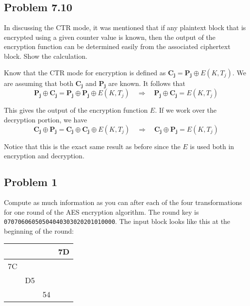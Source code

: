 \documentclass[../hw_sols.tex]{subfiles}
\begin{document}

\subsection*{Problem 7.10}

In discussing the CTR mode, it was mentioned that if any plaintext block that 
is encrypted using a given counter value is known, then the output of the 
encryption function can be determined easily from the associated ciphertext 
block. Show the calculation.

\begin{solution}

Know that the CTR mode for encryption is defined as 
$\mathbf{C_j} = \mathbf{P_j} \oplus E(K,T_j)$. We are assuming that both 
$\mathbf{C_j}$ and $\mathbf{P_j}$ are known. It follows that 
	\[ \mathbf{P_j} \oplus \mathbf{C_j} 
	= \mathbf{P_j} \oplus \mathbf{P_j} \oplus E(K,T_j) 
	\quad \Rightarrow \quad 
	\mathbf{P_j} \oplus \mathbf{C_j} = E(K,T_j) \]

This gives the output of the encryption function $E$. If we work over the 
decryption portion, we have
	\[ \mathbf{C_j} \oplus \mathbf{P_j} 
	= \mathbf{C_j} \oplus \mathbf{C_j} \oplus E(K,T_j) 
	\quad \Rightarrow \quad 
	\mathbf{C_j} \oplus \mathbf{P_j} = E(K,T_j) \]

Notice that this is the exact same result as before since the $E$ is used both 
in encryption and decryption.

\end{solution}


\newpage



\subsection*{Problem 1}

Compute as much information as you can after each of the four transformations 
for one round of the AES encryption algorithm. The round key is 
\verb|07070606050504040303020201010000|. The input block looks like this at 
the beginning of the round:
\begin{center}
\begin{tabular}{| c | c | c | c |}
	\hline
	   &    &    & 7D \\ \hline
	7C &    &    &    \\ \hline
	   & D5 &    &    \\ \hline
	   &    & 54 &    \\ \hline
\end{tabular}
\end{center}
\end{document}
